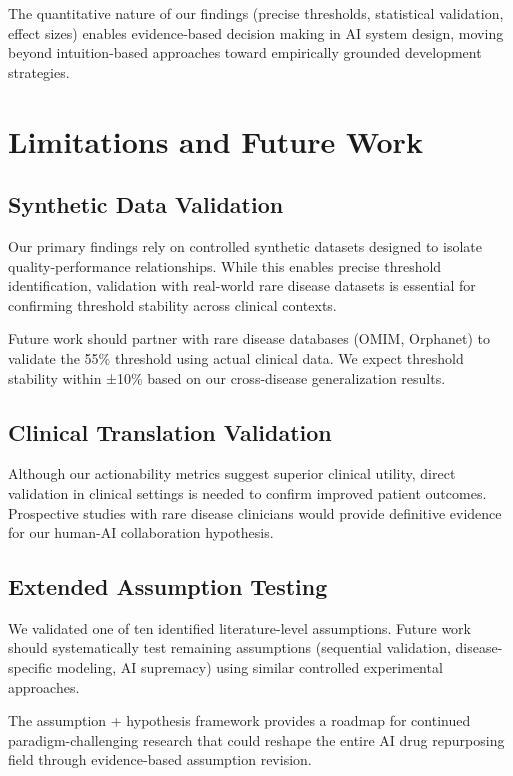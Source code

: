 \documentclass{article}
\begin{document}
The quantitative nature of our findings (precise thresholds, statistical validation, effect sizes) enables evidence-based decision making in AI system design, moving beyond intuition-based approaches toward empirically grounded development strategies.

\section{Limitations and Future Work}

\subsection{Synthetic Data Validation}

Our primary findings rely on controlled synthetic datasets designed to isolate quality-performance relationships. While this enables precise threshold identification, validation with real-world rare disease datasets is essential for confirming threshold stability across clinical contexts.

Future work should partner with rare disease databases (OMIM, Orphanet) to validate the 55\% threshold using actual clinical data. We expect threshold stability within ±10\% based on our cross-disease generalization results.

\subsection{Clinical Translation Validation}

Although our actionability metrics suggest superior clinical utility, direct validation in clinical settings is needed to confirm improved patient outcomes. Prospective studies with rare disease clinicians would provide definitive evidence for our human-AI collaboration hypothesis.

\subsection{Extended Assumption Testing}

We validated one of ten identified literature-level assumptions. Future work should systematically test remaining assumptions (sequential validation, disease-specific modeling, AI supremacy) using similar controlled experimental approaches.

The assumption + hypothesis framework provides a roadmap for continued paradigm-challenging research that could reshape the entire AI drug repurposing field through evidence-based assumption revision.
\end{document}
